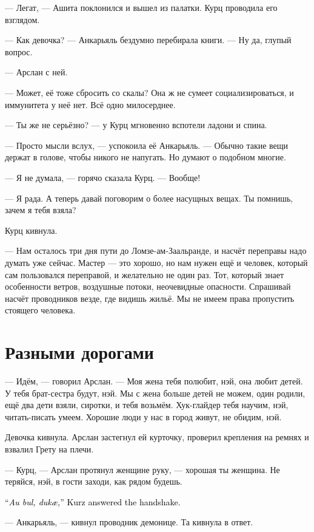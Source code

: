 \documentclass[a4paper,10pt,fleqn]{book}\usepackage{polyglossia}\setdefaultlanguage{english}\setotherlanguage{russian}\defaultfontfeatures{Ligatures=TeX,Mapping=tex-text}\usepackage{xcolor}\definecolor{lightgray}{HTML}{bbbbbb}\color{lightgray}\newcommand{\ml}[3]{\textcolor{black}{#3}}
\begin{document}
--- Легат, --- Ашита поклонился и вышел из палатки.
Курц проводила его взглядом.

--- Как девочка? --- Анкарьяль бездумно перебирала книги.
--- Ну да, глупый вопрос.

--- Арслан с ней.

--- Может, её тоже сбросить со скалы?
Она ж не сумеет социализироваться, и иммунитета у неё нет.
Всё одно милосерднее.

--- Ты же не серьёзно? --- у Курц мгновенно вспотели ладони и спина.

--- Просто мысли вслух, --- успокоила её Анкарьяль.
--- Обычно такие вещи держат в голове, чтобы никого не напугать.
Но думают о подобном многие.

--- Я не думала, --- горячо сказала Курц.
--- Вообще!

--- Я рада.
А теперь давай поговорим о более насущных вещах.
Ты помнишь, зачем я тебя взяла?

Курц кивнула.

--- Нам осталось три дня пути до Ломзе-ам-Заальранде, и насчёт переправы надо думать уже сейчас.
Мастер --- это хорошо, но нам нужен ещё и человек, который сам пользовался переправой, и желательно не один раз.
Тот, который знает особенности ветров, воздушные потоки, неочевидные опасности.
Спрашивай насчёт проводников везде, где видишь жильё.
Мы не имеем права пропустить стоящего человека.

\section{Разными дорогами}

--- Идём, --- говорил Арслан.
--- Моя жена тебя полюбит, нэй, она любит детей.
У тебя брат-сестра будут, нэй.
Мы с жена больше детей не можем, один родили, ещё два дети взяли, сиротки, и тебя возьмём.
Хук-глайдер тебя научим, нэй, читать-писать умеем.
Хорошие люди у нас в город живут, не обидим, нэй.

Девочка кивнула.
Арслан застегнул ей курточку, проверил крепления на ремнях и взвалил Грету на плечи.

--- Курц, --- Арслан протянул женщине руку, --- хорошая ты женщина.
Не теряйся, нэй, в гости заходи, как рядом будешь.

\ml{$0$}
{--- Ау бул, дускай, --- Курц ответила на рукопожатие.}
{``\textit{Au bul, du\th{}k\ae{},}'' Kurz answered the handshake.}

--- Анкарьяль, --- кивнул проводник демонице.
Та кивнула в ответ.
\end{document}
